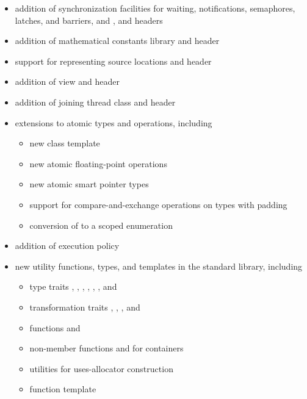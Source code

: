 \begin{itemize}
\item addition of synchronization facilities for
waiting, notifications, semaphores, latches, and barriers, and
,  and  headers
\item addition of mathematical constants library and  header
\item support for representing source locations and  header
\item addition of  view and  header
\item addition of joining thread class and  header
\item extensions to atomic types and operations, including
\begin{itemize}
  \item new class template 
  \item new atomic floating-point operations
  \item new atomic smart pointer types
  \item support for compare-and-exchange operations on types with padding
  \item conversion of  to a scoped enumeration
\end{itemize}
\item addition of  execution policy
\item new utility functions, types, and templates in the standard library, including
\begin{itemize}
  \item \raggedright type traits
    ,
    ,
    ,
    ,
    ,
    , and
  \item transformation traits
    ,
    ,
    , and
  \item functions  and 
  \item non-member functions  and  for containers
  \item utilities for uses-allocator construction
  \item function template 

\end{itemize}
\end{itemize}
